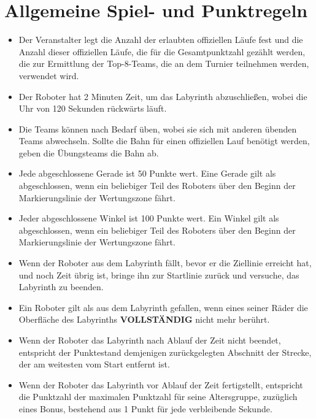 \documentclass[a4paper,12pt]{article}
\begin{document}
\section{Allgemeine Spiel- und Punktregeln}
\begin{itemize}
	\item Der Veranstalter legt die Anzahl der erlaubten offiziellen Läufe fest und die Anzahl dieser offiziellen Läufe, die für die Gesamtpunktzahl gezählt werden, die zur Ermittlung der Top-8-Teams, die an dem Turnier teilnehmen werden, verwendet wird.
	\item Der Roboter hat 2 Minuten Zeit, um das Labyrinth abzuschließen, wobei die Uhr von 120 Sekunden rückwärts läuft.
	\item Die Teams können nach Bedarf üben, wobei sie sich mit anderen übenden Teams abwechseln. Sollte die Bahn für einen offiziellen Lauf benötigt werden, geben die Übungsteams die Bahn ab.
	\item Jede abgeschlossene Gerade ist 50 Punkte wert. Eine Gerade gilt als abgeschlossen, wenn ein beliebiger Teil des Roboters über den Beginn der Markierungslinie der Wertungszone fährt.
	\item Jeder abgeschlossene Winkel ist 100 Punkte wert. Ein Winkel gilt als abgeschlossen, wenn ein beliebiger Teil des Roboters über den Beginn der Markierungslinie der Wertungszone fährt.
	\item Wenn der Roboter aus dem Labyrinth fällt, bevor er die Ziellinie erreicht hat, und noch Zeit übrig ist, bringe ihn zur Startlinie zurück und versuche, das Labyrinth zu beenden.
	\item Ein Roboter gilt als aus dem Labyrinth gefallen, wenn eines seiner Räder die Oberfläche des Labyrinths \textbf{VOLLSTÄNDIG} nicht mehr berührt.
	\item Wenn der Roboter das Labyrinth nach Ablauf der Zeit nicht beendet, entspricht der Punktestand demjenigen zurückgelegten Abschnitt der Strecke, der am weitesten vom Start entfernt ist.
	\item Wenn der Roboter das Labyrinth vor Ablauf der Zeit fertigstellt, entspricht die Punktzahl der maximalen Punktzahl für seine Altersgruppe, zuzüglich eines Bonus, bestehend aus 1 Punkt für jede verbleibende Sekunde.
\end{itemize}
\end{document}
